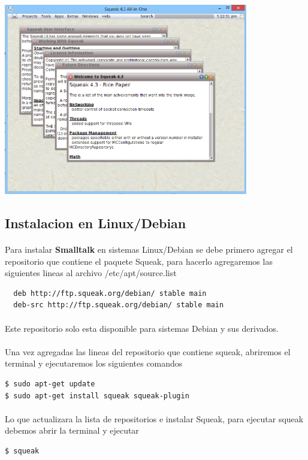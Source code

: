 \documentclass[11pt]{article}
\begin{document}
				\begin{center}
				\includegraphics[width=0.8\textwidth]{images/squeak}
				\end{center}
\subsection{\textbf{Instalacion en Linux/Debian}}
\paragraph{} \noindent
Para instalar \textbf{Smalltalk} en sistemas Linux/Debian se debe primero agregar el repositorio que contiene el paquete Squeak, para hacerlo agregaremos las siguientes lineas al archivo  /etc/apt/source.list

\begin{lstlisting}
  deb http://ftp.squeak.org/debian/ stable main
  deb-src http://ftp.squeak.org/debian/ stable main
\end{lstlisting}
\paragraph{} \noindent
Este repositorio solo esta disponible para sistemas Debian y sus derivados.
\paragraph{} \noindent
Una vez agregadas las lineas del repositorio que contiene squeak, abriremos el terminal y ejecutaremos los siguientes comandos
\begin{lstlisting}
$ sudo apt-get update
$ sudo apt-get install squeak squeak-plugin
\end{lstlisting}
\paragraph{} \noindent
Lo que actualizara la lista de repositorios e instalar Squeak, para ejecutar squeak debemos abrir la terminal y ejecutar
\begin{lstlisting}
$ squeak
\end{lstlisting}
\end{document}
